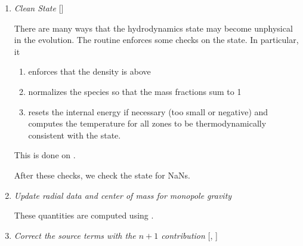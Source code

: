\begin{enumerate}
\begin{enumerate}
  To start the hydrodynamics, we need to know the hydrodynamics source
  terms at time-level $n$, since this enters into the prediction to
  the interface states.  This is essentially the same vector that was
  computed in the previous step, with a few modifications.  The most
  important is that if we set
  , then we extrapolate the
  source terms from $n$ to $n+1/2$, using the change from the previous
  step.

  Note: we neglect the reaction source terms, since those are already
  accounted for in the state directly, due to the Strang-splitting
  nature of this method.

  The update computed here is then immediately applied to
  .


  \item method of lines

  \end{enumerate}

\item \label{strang:clean} {\em Clean State} []


  There are many ways that the hydrodynamics state may become
  unphysical in the evolution.  The  routine
  enforces some checks on the state.  In particular, it
  \begin{enumerate}
  \item enforces that the density is above 
  \item normalizes the species so that the mass fractions sum to 1
  \item resets the internal energy if necessary (too small or negative)
    and computes the temperature for all zones to be thermodynamically 
    consistent with the state.
  \end{enumerate}
  This is done on .

  After these checks, we check the state for NaNs.

\item \label{strang:radial} {\em Update radial data and center of mass for monopole gravity}

 These quantities are computed using .



\item \label{strang:newsource} {\em Correct the source terms with the $n+1$ contribution}
  [, ]


\end{enumerate}

